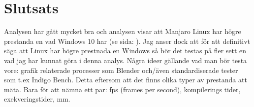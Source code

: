 \documentclass[12pt, a4paper]{report}
\begin{document}
\section{Slutsats}\label{slutsats}

Analysen har gått mycket bra och analysen visar att Manjaro Linux har högre prestanda en vad Windows 10 har (se sida: \pageref{tests}). Jag anser dock att för att definitivt säga att Linux har högre prestnada en Windows så bör det testas på fler sett en vad jag har kunnat göra i denna analys. Några ideer gällande vad man bör testa vore: grafik relaterade processer som Blender\cite{blender} och/även standardiserade tester som t.ex Indigo Bench\cite{indigo}. Detta eftersom att det finns olika typer av prestanda att mäta. Bara för att nämna ett par: fps (frames per second), kompilerings tider, exekveringstider, mm.


\printbibliography[type=online]

\printbibliography[type=misc, title={Bilagor}]
\end{document}
